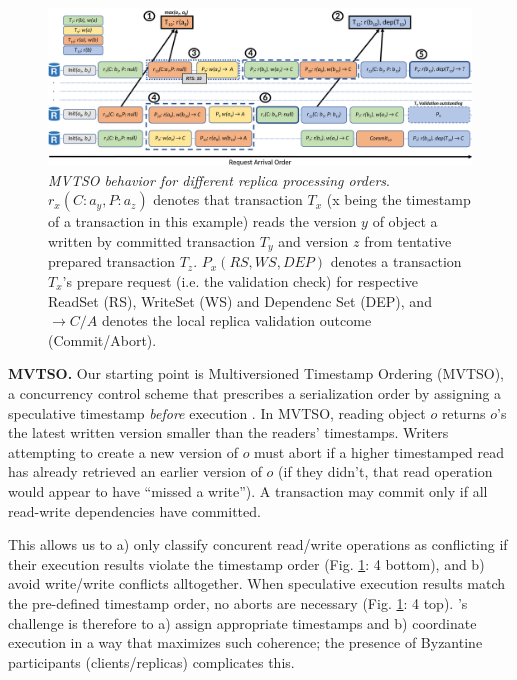 \begin{figure}
\begin{center}
\includegraphics[width= \textwidth]{./figures/MVTSOLargeFont.png}
\end{center}
\caption{\emph{MVTSO behavior for different replica processing orders}. $r_x(C : a_y ,P : a_z)$ denotes that transaction $T_x$ (x being the timestamp of a transaction in this example) reads the version $y$ of object a written by committed transaction $T_y$ and version $z$ from tentative prepared transaction $T_z$. $P_x(RS,WS,DEP)$ denotes a transaction $T_x$'s prepare request (i.e. the validation check) for respective ReadSet (RS), WriteSet (WS) and Dependenc Set (DEP), and $\rightarrow C / A$ denotes the local replica validation outcome (Commit/Abort).} 
\label{fig:MVTSOEX}
\end{figure}

\par \textbf{MVTSO.} Our starting point is Multiversioned Timestamp Ordering (MVTSO), a concurrency control scheme that prescribes a serialization order by assigning a speculative timestamp \textit{before} execution \cite{bernstein1983multiversion, reed1983implementing, su2017tebaldi}. In MVTSO, reading object $o$  returns $o$'s  the latest written version smaller than the readers' timestamps. Writers attempting to create a new version of $o$  must abort if a higher timestamped read has already retrieved an earlier version of $o$ (if they didn't, that read operation would appear to have ``missed a write''). A transaction may commit only if all read-write dependencies have committed.

\iffalse
{}  This allows us to a) only classify concurent read/write operations as conflicting if their execution results violate the timestamp order (Fig. \ref{fig:MVTSOEX}: 4 bottom), and b) avoid write/write conflicts alltogether. 
When speculative execution results match the pre-defined timestamp order, no aborts are necessary (Fig. \ref{fig:MVTSOEX}: 4 top). \sys{}'s challenge is therefore to a) assign appropriate timestamps and b) coordinate execution in a way that maximizes such coherence; the presence of Byzantine participants (clients/replicas) complicates this.

